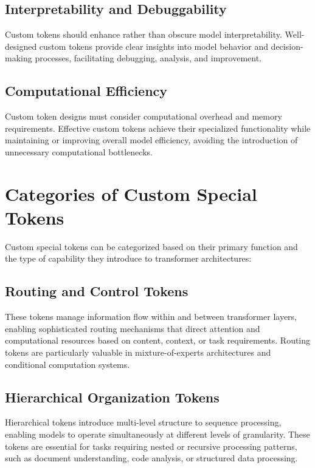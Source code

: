 \subsection{Interpretability and Debuggability}

Custom tokens should enhance rather than obscure model interpretability. Well-designed custom tokens provide clear insights into model behavior and decision-making processes, facilitating debugging, analysis, and improvement.

\subsection{Computational Efficiency}

Custom token designs must consider computational overhead and memory requirements. Effective custom tokens achieve their specialized functionality while maintaining or improving overall model efficiency, avoiding the introduction of unnecessary computational bottlenecks.

\section{Categories of Custom Special Tokens}

Custom special tokens can be categorized based on their primary function and the type of capability they introduce to transformer architectures:

\subsection{Routing and Control Tokens}

These tokens manage information flow within and between transformer layers, enabling sophisticated routing mechanisms that direct attention and computational resources based on content, context, or task requirements. Routing tokens are particularly valuable in mixture-of-experts architectures and conditional computation systems.

\subsection{Hierarchical Organization Tokens}

Hierarchical tokens introduce multi-level structure to sequence processing, enabling models to operate simultaneously at different levels of granularity. These tokens are essential for tasks requiring nested or recursive processing patterns, such as document understanding, code analysis, or structured data processing.


